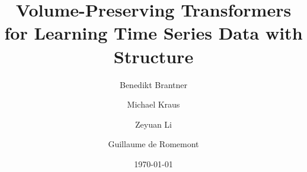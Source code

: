\documentclass[proc]{edpsmath}
\begin{document}
\title{Volume-Preserving Transformers for Learning Time Series Data with Structure}%
%
\author{Benedikt Brantner}\address{Max-Planck-Institut f\"ur Plasmaphysik, Boltzmannstra\ss{}e 2, 85748 Garching}
\author{Michael Kraus} %
\author{Zeyuan Li}\address{Zentrum Mathematik, Technische Universität München, Boltzmannstra\ss{}e 3, 85748 Garching, Germany}
\author{Guillaume de Romemont} \address{DAAA, ONERA, Université Paris Saclay, F-92322, Châtillon, France}
%
\date{\today}

\begin{abstract} 
    
\end{abstract}
%
\begin{resume} 
    
\end{resume}
%
%
%
\maketitle

\pagebreak
\end{document}

